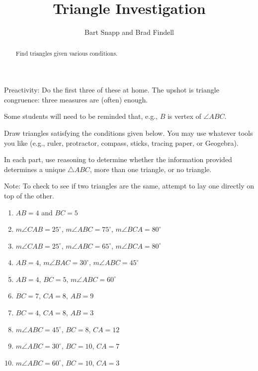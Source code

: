 \documentclass[nooutcomes]{ximera}
\title{Triangle Investigation}
\author{Bart Snapp and Brad Findell}
\begin{document}
\begin{abstract}
  Find triangles given various conditions.
\end{abstract}
\maketitle

\begin{teachingnote}
Preactivity:  Do the first three of these at home.  The upshot is triangle congruence:  three measures are (often) enough.  

Some students will need to be reminded that, e.g., $B$ is vertex of $\angle ABC$.
\end{teachingnote}

\begin{problem}
Draw triangles satisfying the conditions given below.  You may use whatever tools you like (e.g., ruler, protractor, compass, sticks, tracing paper, or Geogebra).  

In each part, use reasoning to determine whether the information provided determines a unique $\triangle ABC$, more than one triangle, or no triangle.%

Note:  To check to see if two triangles are the same, attempt to lay one directly on top of the other.  
\begin{enumerate}

\item $AB = 4$ and $BC = 5$
\item $m\angle CAB = 25^\circ$, $m\angle ABC = 75^\circ$, $m\angle BCA = 80^\circ$
\item $m\angle CAB = 25^\circ$, $m\angle ABC = 65^\circ$, $m\angle BCA = 80^\circ$
\item $AB = 4$, $m\angle BAC = 30^\circ$, $m\angle ABC = 45^\circ$
\item $AB = 4$, $BC = 5$, $m\angle ABC = 60^\circ$
\item $BC = 7$, $CA = 8$, $AB = 9$
\item $BC = 4$, $CA = 8$, $AB = 3$
\item $m\angle ABC = 45^\circ$, $BC = 8$, $CA = 12$
\item $m\angle ABC = 30^\circ$, $BC = 10$, $CA = 7$
\item $m\angle ABC = 60^\circ$, $BC = 10$, $CA = 3$

\end{enumerate}

\end{problem}
\end{document}
